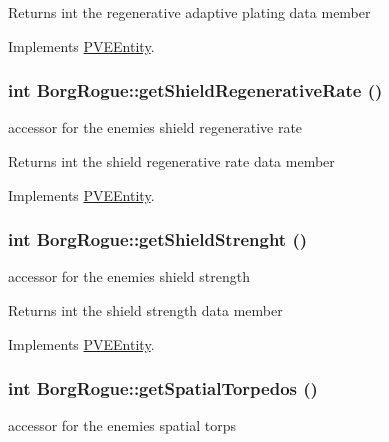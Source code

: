 \begin{DoxyReturn}{Returns}
int the regenerative adaptive plating data member 
\end{DoxyReturn}


Implements \hyperlink{classPVEEntity}{PVEEntity}.

\hypertarget{classBorgRogue_a055c08424838cd6defd5d264b9d55532}{
\subsubsection[{getShieldRegenerativeRate}]{\setlength{\rightskip}{0pt plus 5cm}int BorgRogue::getShieldRegenerativeRate ()}}
\label{db/d4f/classBorgRogue_a055c08424838cd6defd5d264b9d55532}
accessor for the enemies shield regenerative rate

\begin{DoxyReturn}{Returns}
int the shield regenerative rate data member 
\end{DoxyReturn}


Implements \hyperlink{classPVEEntity}{PVEEntity}.

\hypertarget{classBorgRogue_a8d64c0f319f734e69aa9592cbaf29892}{
\subsubsection[{getShieldStrenght}]{\setlength{\rightskip}{0pt plus 5cm}int BorgRogue::getShieldStrenght ()}}
\label{db/d4f/classBorgRogue_a8d64c0f319f734e69aa9592cbaf29892}
accessor for the enemies shield strength

\begin{DoxyReturn}{Returns}
int the shield strength data member 
\end{DoxyReturn}


Implements \hyperlink{classPVEEntity}{PVEEntity}.

\hypertarget{classBorgRogue_ad79dc4b3ce9c83724fc250cb918bcb8f}{
\subsubsection[{getSpatialTorpedos}]{\setlength{\rightskip}{0pt plus 5cm}int BorgRogue::getSpatialTorpedos ()}}
\label{db/d4f/classBorgRogue_ad79dc4b3ce9c83724fc250cb918bcb8f}
accessor for the enemies spatial torps

